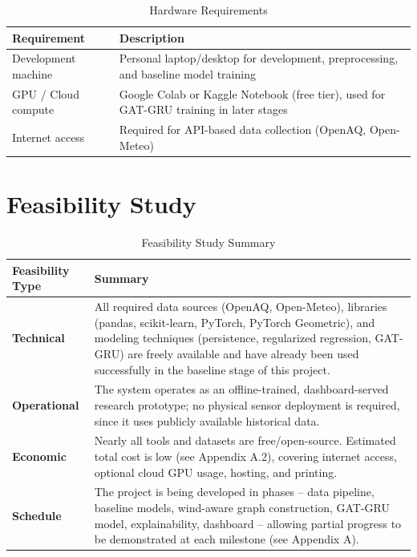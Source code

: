 \begin{table}[H]
    \centering
    \small
    \caption{Hardware Requirements}
    \label{tab:hardware_requirements}
    \renewcommand{\arraystretch}{1.2}
    \begin{tabularx}{0.94\linewidth}{|X|X|}
        \hline
        \textbf{Requirement} & \textbf{Description} \\
        \hline
        Development machine & Personal laptop/desktop for development, preprocessing, and baseline model training \\
        \hline
        GPU / Cloud compute & Google Colab or Kaggle Notebook (free tier), used for GAT-GRU training in later stages \\
        \hline
        Internet access & Required for API-based data collection (OpenAQ, Open-Meteo) \\
        \hline
    \end{tabularx}
\end{table}


\section{Feasibility Study}


\begin{table}[H]
    \centering
    \small
    \caption{Feasibility Study Summary}
    \label{tab:feasibility_study_summary}
    \renewcommand{\arraystretch}{1.2}
    \begin{tabularx}{0.94\linewidth}{|X|X|}
        \hline
        \textbf{Feasibility Type} & \textbf{Summary} \\
        \hline
        \textbf{Technical} & All required data sources (OpenAQ, Open-Meteo), libraries (pandas, scikit-learn, PyTorch, PyTorch Geometric), and modeling techniques (persistence, regularized regression, GAT-GRU) are freely available and have already been used successfully in the baseline stage of this project. \\
        \hline
        \textbf{Operational} & The system operates as an offline-trained, dashboard-served research prototype; no physical sensor deployment is required, since it uses publicly available historical data. \\
        \hline
        \textbf{Economic} & Nearly all tools and datasets are free/open-source. Estimated total cost is low (see Appendix A.2), covering internet access, optional cloud GPU usage, hosting, and printing. \\
        \hline
        \textbf{Schedule} & The project is being developed in phases -- data pipeline, baseline models, wind-aware graph construction, GAT-GRU model, explainability, dashboard -- allowing partial progress to be demonstrated at each milestone (see Appendix A). \\
        \hline
    \end{tabularx}
\end{table}
